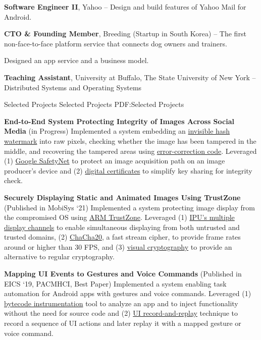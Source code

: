 \documentclass[letterpaper,MMMyyyy,nonstopmode]{simpleresumecv}
\begin{document}
\begin{Body}
\Entry
\textbf{Software Engineer II}, Yahoo
\hfill
{} --
\Gap
\BulletItem
Design and build features of Yahoo Mail for Android.
\hfill

\Gap
\vspace{1ex}

\Entry
\textbf{CTO \& Founding Member}, Breeding (Startup in South Korea)
\hfill
{} --
\Gap
\BulletItem
The first non-face-to-face platform service that connects dog owners and trainers.
\hfill

\Gap
\BulletItem
Designed an app service and a business model.

\Gap
\vspace{1ex}

\Entry
\textbf{Teaching Assistant}, University at Buffalo, The State University of New York
\hfill
{} --
\Gap
\BulletItem
Distributed Systems and Operating Systems 



\vspace{-0.8ex}
\Section
{Selected Projects}
{Selected Projects}
{PDF:Selected Projects}

\Entry
\textbf{End-to-End System Protecting Integrity of Images Across Social Media} 
(in Progress)
\Gap
\BulletItem
Implemented a system embedding an \underline{invisible hash watermark} into raw 
pixels, checking whether the image has been tampered in the middle, and 
recovering the tampered areas using \underline{error-correction code}.
\BulletItem
Leveraged (1) \underline{Google SafetyNet} to protect an image acquisition path 
on an image producer's device and (2) \underline{digital certificates} to 
simplify key sharing for integrity check. 

\vspace{1ex}
\Entry
\textbf{Securely Displaying Static and Animated Images Using TrustZone} 
(Published in MobiSys `21)
\Gap
\BulletItem
Implemented a system protecting image display from the compromised OS using 
\underline{ARM TrustZone}.
\BulletItem
Leveraged (1) \underline{IPU's multiple display channels} to enable simultaneous 
displaying from both untrusted and trusted domains, (2) \underline{ChaCha20}, 
a fast stream cipher, to provide frame rates around or higher than 30 FPS, 
and (3) \underline{visual cryptography} to provide an alternative to regular 
cryptography.

\vspace{1ex}
\Entry
\textbf{Mapping UI Events to Gestures and Voice Commands} 
(Published in EICS ‘19, PACM­HCI, Best Paper)
\Gap
\BulletItem
Implemented a system enabling task automation for Android apps with gestures 
and voice commands. 
\BulletItem
Leveraged (1) \underline{bytecode instrumentation} tool to analyze an app and 
to inject functionality without the need for source code and 
(2) \underline{UI record-and-replay} technique to record a sequence of UI 
actions and later replay it with a mapped gesture or voice command.



\end{Body}
\end{document}
